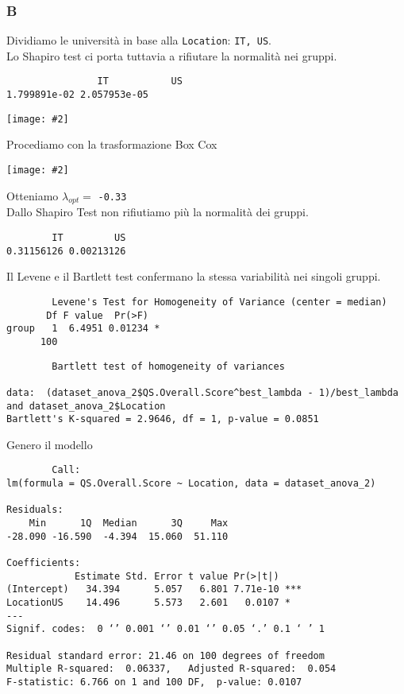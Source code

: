 \documentclass{beamer}
\newcommand{\fg}[2]{%
  \begin{center}
      \texttt{[image: \#2]}%
  \end{center}
}
\begin{document}
\begin{frame}[fragile]
\frametitle{B}
    Dividiamo le università in base alla \texttt{Location}: \texttt{IT, US}.\\
	Lo Shapiro test ci porta tuttavia a rifiutare la normalità nei gruppi.
	{\SMALL
 \begin{verbatim}
		        IT           US 
1.799891e-02 2.057953e-05
	\end{verbatim}
 }
    \fg{0.4}{anova2.jpg}
\end{frame}

\begin{frame}[fragile]
    Procediamo con la trasformazione Box Cox
    \fg{0.4}{boxcox2.jpg}
    Otteniamo $\lambda_{opt} =$ \texttt{-0.33}\\
    Dallo Shapiro Test non rifiutiamo più la normalità dei gruppi.
    \begin{verbatim}
        IT         US 
0.31156126 0.00213126
    \end{verbatim}	
\end{frame}

\begin{frame}[fragile]
    Il Levene e il Bartlett test confermano la stessa variabilità nei singoli gruppi.
    {\tiny
    \begin{verbatim}
        Levene's Test for Homogeneity of Variance (center = median)
       Df F value  Pr(>F)  
group   1  6.4951 0.01234 *
      100
    \end{verbatim}
    }
    {\tiny
    \begin{verbatim}
        Bartlett test of homogeneity of variances

data:  (dataset_anova_2$QS.Overall.Score^best_lambda - 1)/best_lambda and dataset_anova_2$Location
Bartlett's K-squared = 2.9646, df = 1, p-value = 0.0851
    \end{verbatim}
    }
\end{frame}

\begin{frame}[fragile]
	Genero il modello
	{\tiny
	\begin{verbatim}
		Call:
lm(formula = QS.Overall.Score ~ Location, data = dataset_anova_2)

Residuals:
    Min      1Q  Median      3Q     Max 
-28.090 -16.590  -4.394  15.060  51.110 

Coefficients:
            Estimate Std. Error t value Pr(>|t|)    
(Intercept)   34.394      5.057   6.801 7.71e-10 ***
LocationUS    14.496      5.573   2.601   0.0107 *  
---
Signif. codes:  0 ‘’ 0.001 ‘’ 0.01 ‘’ 0.05 ‘.’ 0.1 ‘ ’ 1

Residual standard error: 21.46 on 100 degrees of freedom
Multiple R-squared:  0.06337,	Adjusted R-squared:  0.054 
F-statistic: 6.766 on 1 and 100 DF,  p-value: 0.0107
	\end{verbatim}
	}
\end{frame}
\end{document}
